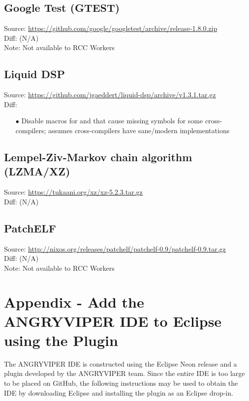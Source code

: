 \begin{appendices}
\subsection{Google Test (GTEST)}
\label{App:gtest}
Source: \url{https://github.com/google/googletest/archive/release-1.8.0.zip}\\
Diff: (N/A)\\
Note: Not available to RCC Workers

\subsection{Liquid DSP}
Source: \url{https://github.com/jgaeddert/liquid-dsp/archive/v1.3.1.tar.gz}\\
Diff: 
\label{App:liquid}
\begin{enumerate}
\item[$\bullet$] Disable  macros for  and  that cause missing  symbols for some cross-compilers; assumes cross-compilers have sane/modern  implementations
\end{enumerate}

\subsection{Lempel-Ziv-Markov chain algorithm (LZMA/XZ)}
Source: \url{https://tukaani.org/xz/xz-5.2.3.tar.gz}\\
Diff: (N/A)
\label{App:xz}

\subsection{PatchELF}
Source: \url{http://nixos.org/releases/patchelf/patchelf-0.9/patchelf-0.9.tar.gz}\\
Diff: (N/A)\\
Note: Not available to RCC Workers
\label{App:patchelf}


\newpage
\section{Appendix - Add the ANGRYVIPER IDE to Eclipse using the Plugin}
\label{App:IDE_plugin}
The ANGRYVIPER IDE is constructed using the Eclipse Neon release and a plugin developed by the ANGRYVIPER team. Since the entire IDE is too large to be placed on GitHub, the following instructions may be used to obtain the IDE by downloading Eclipse and installing the plugin as an Eclipse drop-in.


\end{appendices}
